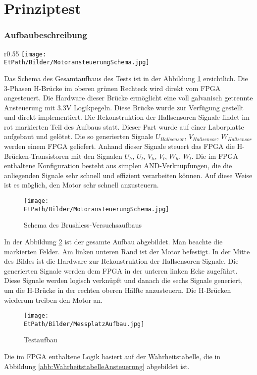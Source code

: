 \ifSTANDALONE
\section{Prinziptest}
\fi
\ifEMBED
\subsubsection{Aufbaubeschreibung}
    \BLDCcollab
\fi
\ifEMBED
    \begin{wrapfigure}{r}{0.55\textwidth}
       	\texttt{[image: \\EtPath/Bilder/MotoransteuerungSchema.jpg]}
       	\centering
       	\caption{Schema des Brushless-Versuchsaufbaus}
        \label{abb:MotoransteuerungSchema}
    \end{wrapfigure}
\fi
    Das Schema des Gesamtaufbaus des Tests ist in der Abbildung 
    \ref{abb:MotoransteuerungSchema} ersichtlich. Die 3-Phasen H-Brücke 
    im oberen grünen Rechteck wird direkt vom FPGA angesteuert. Die Hardware 
    dieser Brücke ermöglicht eine voll galvanisch getrennte Ansteuerung 
    mit 3.3V Logikpegeln. Diese Brücke wurde zur Verfügung gestellt und direkt
    implementiert. Die Rekonstruktion der Hallsensoren-Signale findet im rot 
    markierten Teil des Aufbaus statt. Dieser Part wurde auf einer 
    Laborplatte aufgebaut und gelötet. Die so generierten Signale 
    $U_{Hallsensor}$, $V_{Hallsensor}$, $W_{Hallsensor}$ werden einem FPGA 
    geliefert. Anhand dieser Signale steuert das FPGA die 
    H-Brücken-Transistoren mit den Signalen $U_h$, $U_l$, $V_h$, $V_l$, 
    $W_h$, $W_l$. Die im FPGA enthaltene Konfiguration besteht aus simplen 
    AND-Verknüpfungen, die die anliegenden Signale sehr schnell und 
    effizient verarbeiten können. Auf diese Weise ist es möglich, den Motor sehr 
    schnell anzusteuern.
    \ifSTANDALONE
    \begin{figure}[h!]
    	\texttt{[image: \\EtPath/Bilder/MotoransteuerungSchema.jpg]}
       	\centering
       	\caption{Schema des Brushless-Versuchsaufbaus}
        \label{abb:MotoransteuerungSchema}
    \end{figure}
    \fi
    In der Abbildung \ref{abb:MessplatzAufbau} ist der gesamte Aufbau 
    abgebildet. Man beachte die markierten Felder. Am linken unteren Rand 
    ist der Motor befestigt. In der Mitte des Bildes ist die Hardware zur Rekonstruktion der Hallsensoren-Signale.
    Die generierten Signale werden dem FPGA in der unteren linken Ecke zugeführt. Diese 
    Signale werden logisch verknüpft und danach die sechs Signale 
    generiert, um die H-Brücke in der rechten oberen Hälfte anzusteuern. 
    Die H-Brücken wiederum treiben den Motor an.
    \begin{figure}[h!]
       	\texttt{[image: \\EtPath/Bilder/MessplatzAufbau.jpg]}
       	\centering
       	\caption{Testaufbau} 
        \label{abb:MessplatzAufbau}
    \end{figure}
    Die im FPGA enthaltene Logik basiert auf der Wahrheitstabelle, die in 
    Abbildung \ref{abb:WahrheitstabelleAnsteuerung} abgebildet ist.

